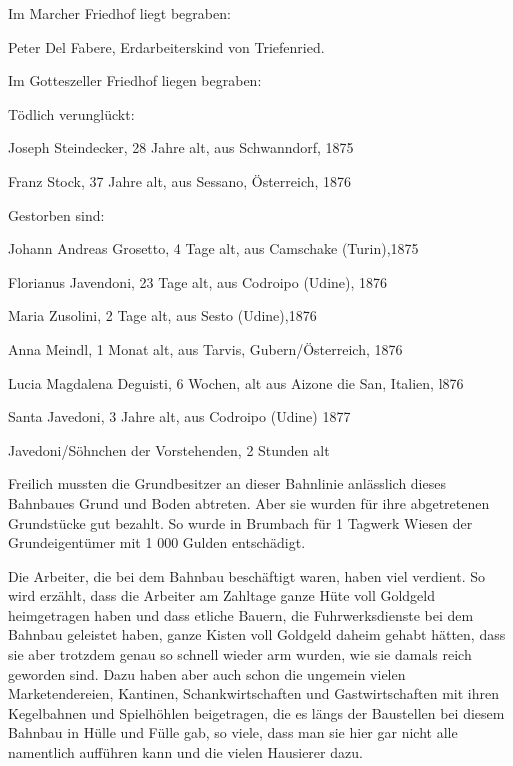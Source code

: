 \documentclass[12pt,a4pager,draft]{book}
\begin{document}
Im Marcher Friedhof liegt begraben:

\begin{compactitem}
\item Peter Del Fabere, Erdarbeiterskind von Triefenried.
\end{compactitem}

Im Gotteszeller Friedhof liegen begraben:

Tödlich verunglückt:

\begin{compactitem}
\item Joseph Steindecker, 28 Jahre alt, aus Schwanndorf, 1875
\item Franz Stock, 37 Jahre alt, aus Sessano, Österreich, 1876
\end{compactitem}

Gestorben sind:

\begin{compactitem}
\item Johann Andreas Grosetto, 4 Tage alt, aus Camschake (Turin),1875
\item Florianus Javendoni, 23 Tage alt, aus Codroipo (Udine), 1876
\item Maria Zusolini, 2 Tage alt, aus Sesto (Udine),1876
\item Anna Meindl, 1 Monat alt, aus Tarvis, Gubern/Österreich, 1876
\item Lucia Magdalena Deguisti, 6 Wochen, alt aus Aizone die San, Italien, l876
\item Santa Javedoni, 3 Jahre alt, aus Codroipo (Udine) 1877
\item Javedoni/Söhnchen der Vorstehenden, 2 Stunden alt
\end{compactitem}

Freilich mussten die Grundbesitzer an dieser Bahnlinie anlässlich dieses
Bahnbaues Grund und Boden abtreten. Aber sie wurden für ihre abgetretenen
Grundstücke gut bezahlt. So wurde in Brumbach für 1 Tagwerk Wiesen der
Grundeigentümer mit 1 000 Gulden entschädigt.

Die Arbeiter, die bei dem Bahnbau beschäftigt waren, haben viel verdient. So
wird erzählt, dass die Arbeiter am Zahltage ganze Hüte voll Goldgeld
heimgetragen haben und dass etliche Bauern, die Fuhrwerksdienste bei dem Bahnbau
geleistet haben, ganze Kisten voll Goldgeld daheim gehabt hätten, dass sie aber
trotzdem genau so schnell wieder arm wurden, wie sie damals reich geworden sind.
Dazu haben aber auch schon die ungemein vielen Marketendereien, Kantinen,
Schankwirtschaften und Gastwirtschaften mit ihren Kegelbahnen und Spielhöhlen
beigetragen, die es längs der Baustellen bei diesem Bahnbau in Hülle und Fülle
gab, so viele, dass man sie hier gar nicht alle namentlich aufführen kann und
die vielen Hausierer dazu.
\end{document}
